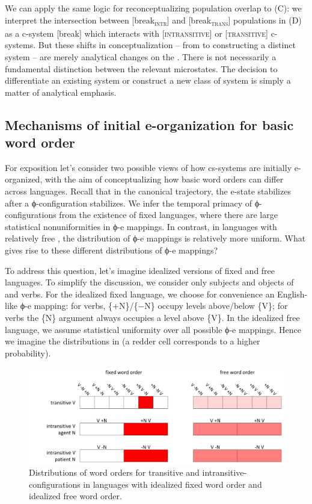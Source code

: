   We can apply the same logic for reconceptualizing population overlap to (C): we interpret the intersection between [break\textsubscript{\textsc{intr}}] and [break\textsubscript{\textsc{trans}}] populations in (D) as a c-system [break] which interacts with [\textsc{intransitive}] or [\textsc{transitive}] c-systems. But these shifts in conceptualization -- from  to constructing a distinct system -- are merely analytical changes on the . There is not necessarily a fundamental distinction between the relevant microstates. The  decision to differentiate an existing system or construct a new class of system is simply a matter of analytical emphasis.

\subsection{Mechanisms of initial e-organization for basic word order}

For exposition let's consider two possible views of how cs-systems are initially e-organized, with the aim of conceptualizing how basic word orders can differ across languages. Recall that in the canonical trajectory, the e-state stabilizes after a ϕ-configuration stabilizes. We infer the temporal primacy of ϕ-con\-fig\-u\-ra\-tions from the existence of fixed  languages, where there are large statistical nonuniformities in ϕ-e mappings. In contrast, in languages with relatively free , the distribution of ϕ-e mappings is relatively more uniform. What gives rise to these different distributions of ϕ-e mappings?

  To address this question, let's imagine idealized versions of fixed and free  languages. To simplify the discussion, we consider only subjects and objects of  and  verbs. For the idealized fixed  language, we choose for convenience an English-like ϕ-e mapping: for  verbs, \{+N\}/\{−N\} occupy levels above/below \{V\}; for  verbs the \{N\} argument always occupies a level above \{V\}. In the idealized free  language, we assume statistical uniformity over all possible ϕ-e mappings. Hence we imagine the distributions in {} (a redder cell corresponds to a higher probability).

  
\begin{figure}
\includegraphics[width=\textwidth]{figures/Tilsen-img74.png}
\caption{Distributions of word orders for transitive and intransitive-configurations in languages with idealized fixed word order and idealized free word order.}
\label{fig:4:24}
\end{figure}
 

